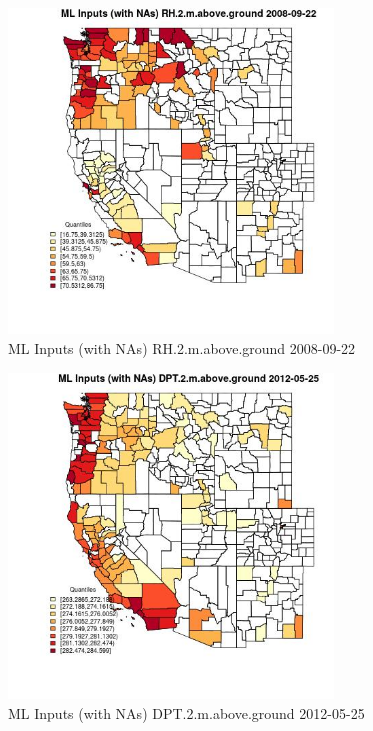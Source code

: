 \begin{figure} 
\centering  
\includegraphics[width=0.77\textwidth]{Code_Outputs/Report_ML_input_PM25_Step4_part_e_de_duplicated_aves_compiled_2019-05-18wNAs_CountyRH2mabovegroundMean2008-09-22_2008-09-22.jpg} 
\caption{\label{fig:Report_ML_input_PM25_Step4_part_e_de_duplicated_aves_compiled_2019-05-18wNAsCountyRH2mabovegroundMean2008-09-22_2008-09-22}ML Inputs (with NAs) RH.2.m.above.ground 2008-09-22} 
\end{figure} 
 

\begin{figure} 
\centering  
\includegraphics[width=0.77\textwidth]{Code_Outputs/Report_ML_input_PM25_Step4_part_e_de_duplicated_aves_compiled_2019-05-18wNAs_CountyDPT2mabovegroundMean2012-05-25_2012-05-25.jpg} 
\caption{\label{fig:Report_ML_input_PM25_Step4_part_e_de_duplicated_aves_compiled_2019-05-18wNAsCountyDPT2mabovegroundMean2012-05-25_2012-05-25}ML Inputs (with NAs) DPT.2.m.above.ground 2012-05-25} 
\end{figure} 
 

